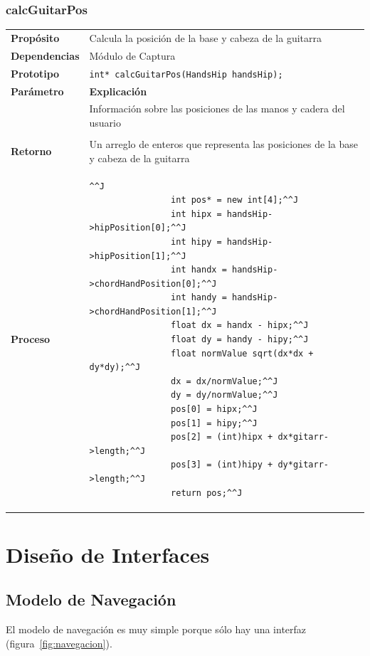 \documentclass[a4paper,12pt]{article}
\begin{document}
\subsubsection{calcGuitarPos}
\begin{tabularx}{\textwidth}{p{25mm} X}
        \textbf{Propósito} & Calcula la posición de la base y cabeza de la guitarra\\
        \textbf{Dependencias} & Módulo de Captura \\
        \textbf{Prototipo} & \lstinline{int* calcGuitarPos(HandsHip handsHip);}\\
        \textbf{Parámetro} & \textbf{Explicación} \\
        \begin{tabular}{p{2cm} l}
                handsHip & Información sobre las posiciones de las manos y cadera del usuario \\
        \end{tabular}\\

        \textbf{Retorno} & Un arreglo de enteros que representa las posiciones de la base y cabeza de la guitarra\\
        \textbf{Proceso} & 
        \begin{lstlisting}[breaklines=true]^^J
                int pos* = new int[4];^^J
                int hipx = handsHip->hipPosition[0];^^J
                int hipy = handsHip->hipPosition[1];^^J
                int handx = handsHip->chordHandPosition[0];^^J
                int handy = handsHip->chordHandPosition[1];^^J
                float dx = handx - hipx;^^J
                float dy = handy - hipy;^^J
                float normValue sqrt(dx*dx + dy*dy);^^J
                dx = dx/normValue;^^J
                dy = dy/normValue;^^J
                pos[0] = hipx;^^J
                pos[1] = hipy;^^J
                pos[2] = (int)hipx + dx*gitarr->length;^^J
                pos[3] = (int)hipy + dy*gitarr->length;^^J
                return pos;^^J
        \end{lstlisting}

\end{tabularx}
\section{Diseño de Interfaces}
\subsection{Modelo de Navegación}
El modelo de navegación es muy simple porque sólo hay una interfaz
(figura~\ref{fig:navegacion}).
\end{document}
